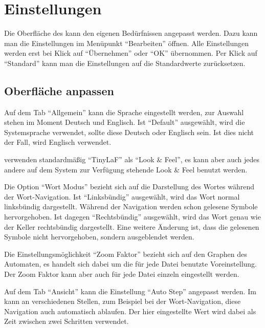 

\chapter{Einstellungen}\label{Preferences}

Die Oberfläche des \gtitools kann den eigenen Bedürfnissen angepasst werden.
Dazu kann man die Einstellungen im Menüpunkt "`Bearbeiten"' öffnen. Alle
Einstellungen werden erst bei Klick auf "`Übernehmen"' oder "`OK"' übernommen.
Per Klick auf "`Standard"' kann man die Einstellungen auf die Standardwerte
zurücksetzen.


\section{Oberfläche anpassen}

Auf dem Tab "`Allgemein"' kann die Sprache eingestellt werden, zur Auswahl
stehen im Moment Deutsch und Englisch. Ist "`Default"' ausgewählt, wird
die Systemsprache verwendet, sollte diese Deutsch oder Englisch sein. Ist dies
nicht der Fall, wird Englisch verwendet.\vspace{10pt}

\gtitool verwenden standardmäßig "`TinyLaF"' als "`Look \& Feel"', es kann aber
auch jedes andere auf dem System zur Verfügung stehende Look \& Feel benutzt
werden.\vspace{10pt}

Die Option "`Wort Modus"' bezieht sich auf die Darstellung des Wortes während
der Wort-Navigation. Ist "`Linksbündig"' ausgewählt, wird das Wort normal
linksbündig dargestellt. Während der Navigation werden schon gelesene Symbole
hervorgehoben. Ist dagegen "`Rechtsbündig"' ausgewählt, wird das Wort genau wie
der Keller rechtsbündig dargestellt. Eine weitere Änderung ist, dass die
gelesenen Symbole nicht hervorgehoben, sondern ausgeblendet werden.\vspace{10pt}

Die Ein\-stell\-ungs\-möglich\-keit "`Zoom Faktor"' bezieht sich auf den Graphen
des Automaten, es handelt sich dabei um die für jede Datei benutzte
Voreinstellung. Der Zoom Faktor kann aber auch für jede Datei einzeln eingestellt
werden.\vspace{10pt}

\newpage
Auf dem Tab "`Ansicht"' kann die Einstellung "`Auto Step"' angepasst werden. Im
\gtitool kann an verschiedenen Stellen, zum Beispiel bei der Wort-Navigation,
diese Navigation auch automatisch ablaufen. Der hier eingestellte Wert wird dabei
als Zeit zwischen zwei Schritten verwendet.\vspace{10pt}

